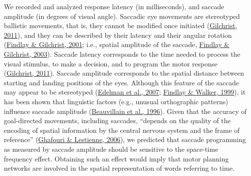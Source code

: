 \documentclass[
  a4paper,12pt,twoside,onecolumn,openright,final,oldfontcommands]{memoir}
\begin{document}
We recorded and analyzed response latency (in milliseconds), and saccade amplitude (in degrees of visual angle). Saccadic eye movements are stereotyped ballistic movements, that is, they cannot be modified once initiated (\protect\hyperlink{ref-gilchrist_saccades_2011}{Gilchrist, 2011}), and they can be described by their latency and their angular rotation (\protect\hyperlink{ref-findlay_visual_2001}{Findlay \& Gilchrist, 2001}; i.e., spatial amplitude of the saccade, \protect\hyperlink{ref-findlay_active_2003}{Findlay \& Gilchrist, 2003}). Saccade latency corresponds to the time needed to process the visual stimulus, to make a decision, and to program the motor response (\protect\hyperlink{ref-gilchrist_saccades_2011}{Gilchrist, 2011}). Saccade amplitude corresponds to the spatial distance between starting and landing positions of the eyes. Although this feature of the saccade may appear to be stereotyped (\protect\hyperlink{ref-edelman_influence_2007}{Edelman et al., 2007}; \protect\hyperlink{ref-findlay_model_1999}{Findlay \& Walker, 1999}), it has been shown that linguistic factors (e.g., unusual orthographic patterns) influence saccade amplitude (\protect\hyperlink{ref-beauvillain_center_1996}{Beauvillain et al., 1996}). Given that the accuracy of goal-directed movements, including saccades, ``depends on the quality of the encoding of spatial information by the central nervous system and the frame of reference'' (\protect\hyperlink{ref-ghafouri_contribution_2006}{Ghafouri \& Lestienne, 2006}), we predicted that saccade programming as measured by saccade amplitude should be sensitive to the space-time frequency effect. Obtaining such an effect would imply that motor planning networks are involved in the spatial representation of words referring to time.
\end{document}
